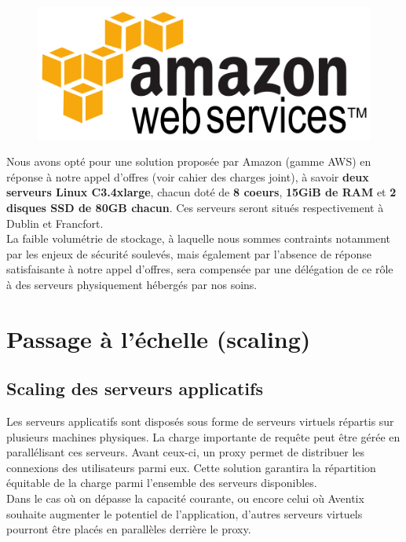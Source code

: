 \begin{figure}[H]
    \centering
    \includegraphics[width=\textwidth]{aws}
\end{figure}

Nous avons opté pour une solution proposée par Amazon (gamme AWS) en réponse à notre appel d'offres (voir cahier des charges joint), à savoir
\textbf{deux serveurs Linux C3.4xlarge}, chacun doté de \textbf{8 coeurs},
\textbf{15GiB de RAM} et \textbf{2 disques SSD de 80GB chacun}. Ces serveurs
seront situés respectivement à Dublin et Francfort. \\

La faible volumétrie de stockage, à laquelle nous sommes contraints notamment par les
enjeux de sécurité soulevés, mais également par l'absence de réponse satisfaisante à notre appel d'offres, sera compensée par une délégation de ce rôle à
des serveurs physiquement hébergés par nos soins.

\section{Passage à l'échelle (scaling)}
\label{sec:scaling}

\subsection{Scaling des serveurs applicatifs}
\label{subsec:scaling-applicatif}

Les serveurs applicatifs sont disposés sous forme de serveurs virtuels
répartis sur plusieurs machines physiques. La charge importante de requête
peut être gérée en parallélisant ces serveurs. Avant ceux-ci, un proxy permet
de distribuer les connexions des utilisateurs parmi eux. Cette solution
garantira la répartition équitable de la charge parmi l'ensemble des serveurs
disponibles. \\

Dans le cas où on dépasse la capacité courante, ou encore celui où Aventix souhaite
augmenter le potentiel de l'application, d'autres serveurs virtuels pourront
être placés en parallèles derrière le proxy. \\

